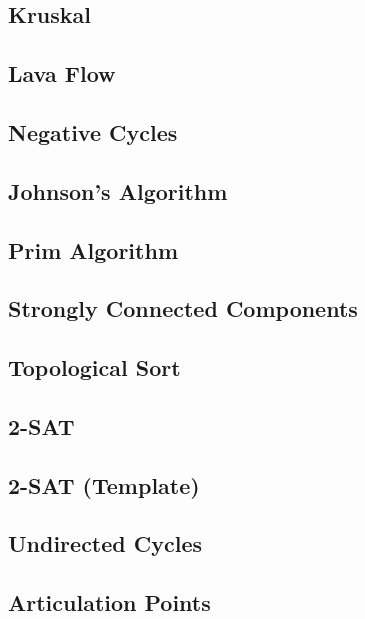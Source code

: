 \documentclass[10pt,letterpaper,landscape,twocolumn]{article}
\begin{document}
\subsection{Kruskal}

\subsection{Lava Flow}

\subsection{Negative Cycles}

\subsection{Johnson's Algorithm}

\subsection{Prim Algorithm}

\subsection{Strongly Connected Components}

\subsection{Topological Sort}

\subsection{2-SAT}

\subsection{2-SAT (Template)}

\subsection{Undirected Cycles}

\subsection{Articulation Points}

\end{document}
